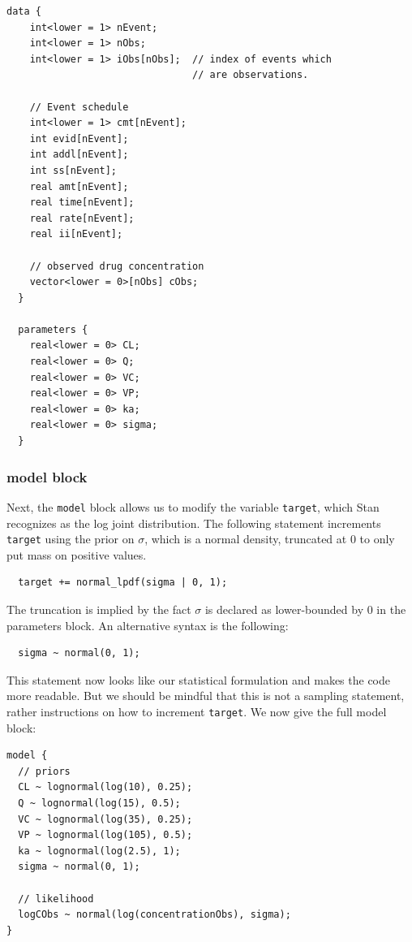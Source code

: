 \begin{lstlisting}[style=stan, numbers=none] 
  data {
    int<lower = 1> nEvent;
    int<lower = 1> nObs;
    int<lower = 1> iObs[nObs];  // index of events which
                                // are observations.

    // Event schedule
    int<lower = 1> cmt[nEvent];
    int evid[nEvent];
    int addl[nEvent];
    int ss[nEvent];
    real amt[nEvent];
    real time[nEvent];
    real rate[nEvent];
    real ii[nEvent];

    // observed drug concentration
    vector<lower = 0>[nObs] cObs;
  }
  
  parameters {
    real<lower = 0> CL;
    real<lower = 0> Q;
    real<lower = 0> VC;
    real<lower = 0> VP;
    real<lower = 0> ka;
    real<lower = 0> sigma;
  }
\end{lstlisting}

\subsubsection{model block}

Next, the \texttt{model} block allows us to modify the variable \texttt{target}, which Stan recognizes as the log joint distribution.
The following statement increments \texttt{target} using the prior on $\sigma$, which is a normal density, truncated at 0 to only put mass on positive values.
\begin{lstlisting}
  target += normal_lpdf(sigma | 0, 1);
\end{lstlisting}
The truncation is implied by the fact $\sigma$ is declared as lower-bounded by 0 in the parameters block.
An alternative syntax is the following:
\begin{lstlisting}
  sigma ~ normal(0, 1);
\end{lstlisting}
This statement now looks like our statistical formulation and makes the code more readable.
But we should be mindful that this is not a sampling statement, rather instructions on how to increment \texttt{target}.
We now give the full model block:
\begin{lstlisting}
model {
  // priors
  CL ~ lognormal(log(10), 0.25); 
  Q ~ lognormal(log(15), 0.5);
  VC ~ lognormal(log(35), 0.25);
  VP ~ lognormal(log(105), 0.5);
  ka ~ lognormal(log(2.5), 1);
  sigma ~ normal(0, 1);

  // likelihood
  logCObs ~ normal(log(concentrationObs), sigma);
}
\end{lstlisting}

